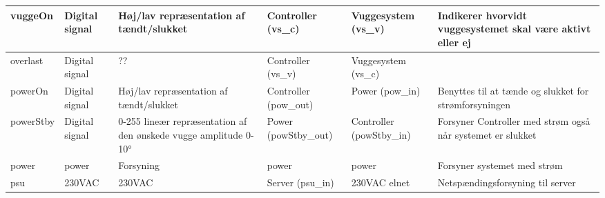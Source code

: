 \begin{center}
\begin{longtable}{|p{2cm}|p{2cm}|p{2cm}|p{2cm}|p{2cm}|p{}|}
vuggeOn			&Digital signal 			&Høj/lav repræsentation af tændt/slukket 
&Controller (vs\_c) 	&Vuggesystem (vs\_v)			&Indikerer hvorvidt vuggesystemet skal være aktivt eller ej 				\\\hline

overlast			&Digital signal			&??   
&Controller (vs\_v) 	&Vuggesystem (vs\_c)			&  				\\\hline

powerOn			&Digital signal				&Høj/lav repræsentation af tændt/slukket 
&Controller (pow\_out) 			&Power (pow\_in)	&Benyttes til at tænde og slukket for strømforsyningen   				\\\hline

powerStby		&Digital signal 				&0-255 lineær repræsentation af den ønskede vugge amplitude 0-10°   &Power (powStby\_out)			&Controller (powStby\_in)	& Forsyner Controller med strøm også når systemet er slukket   				\\\hline

power			&power 				&Forsyning
&power 			&power				&Forsyner systemet med strøm   				\\\hline

psu				&230VAC 				&230VAC
&Server 	(psu\_in)	&230VAC elnet			&Netspændingsforsyning til server   				\\\hline

\end{longtable}
\end{center}
